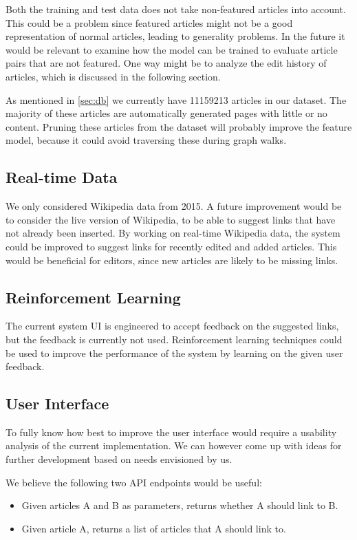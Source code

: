 Both the training and test data does not take non-featured articles into account. This could be a problem since featured articles might not be a good representation of normal articles, leading to generality problems. In the future it would be relevant to examine how the model can be trained to evaluate article pairs that are not featured. One way might be to analyze the edit history of articles, which is discussed in the following section. %

As mentioned in \cref{sec:db} we currently have \num{11159213} articles in our dataset. The majority of these articles are automatically generated pages with little or no content. Pruning these articles from the dataset will probably improve the feature model, because it could avoid traversing these during graph walks.

\subsection{Real-time Data}
We only considered Wikipedia data from 2015. A future improvement would be to consider the live version of Wikipedia, to be able to suggest links that have not already been inserted.
By working on real-time Wikipedia data, the system could be improved to suggest links for recently edited and added articles. This would be beneficial for editors, since new articles are likely to be missing links.

\subsection{Reinforcement Learning}
The current system UI is engineered to accept feedback on the suggested links, but the feedback is currently not used. Reinforcement learning techniques could be used to improve the performance of the system by learning on the given user feedback.

\subsection{User Interface}
To fully know how best to improve the user interface would require a usability analysis of the current implementation. We can however come up with ideas for further development based on needs envisioned by us.

We believe the following two API endpoints would be useful:
\begin{itemize}
    \item Given articles A and B as parameters, returns whether A should link to B.
    \item Given article A, returns a list of articles that A should link to.
\end{itemize}

